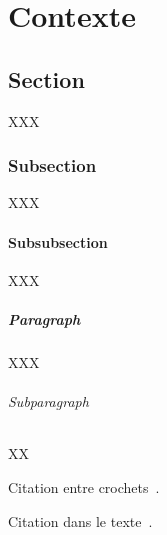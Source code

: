 \chapter*{Contexte}
\label{chap:contexte}

\section{Section}

XXX

\subsection{Subsection}

XXX

\subsubsection{Subsubsection}

XXX

\paragraph{Paragraph}

XXX

\subparagraph{Subparagraph}

XX

Citation entre crochets~\citep{refRE1,refRE2}.

Citation dans le texte~\citet{ref4}.


